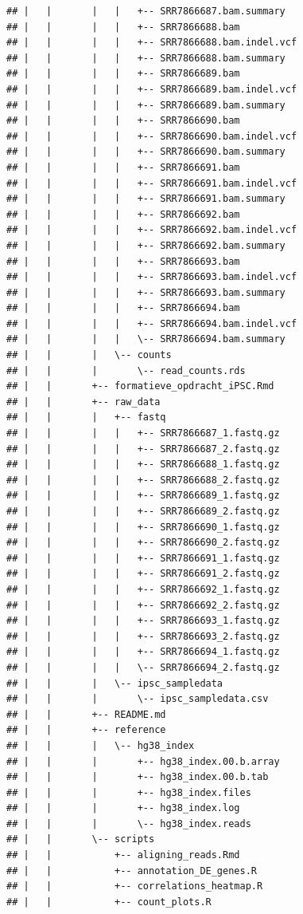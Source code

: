 \documentclass[
]{book}
\begin{document}
\begin{verbatim}
## |   |       |   |   +-- SRR7866687.bam.summary
## |   |       |   |   +-- SRR7866688.bam
## |   |       |   |   +-- SRR7866688.bam.indel.vcf
## |   |       |   |   +-- SRR7866688.bam.summary
## |   |       |   |   +-- SRR7866689.bam
## |   |       |   |   +-- SRR7866689.bam.indel.vcf
## |   |       |   |   +-- SRR7866689.bam.summary
## |   |       |   |   +-- SRR7866690.bam
## |   |       |   |   +-- SRR7866690.bam.indel.vcf
## |   |       |   |   +-- SRR7866690.bam.summary
## |   |       |   |   +-- SRR7866691.bam
## |   |       |   |   +-- SRR7866691.bam.indel.vcf
## |   |       |   |   +-- SRR7866691.bam.summary
## |   |       |   |   +-- SRR7866692.bam
## |   |       |   |   +-- SRR7866692.bam.indel.vcf
## |   |       |   |   +-- SRR7866692.bam.summary
## |   |       |   |   +-- SRR7866693.bam
## |   |       |   |   +-- SRR7866693.bam.indel.vcf
## |   |       |   |   +-- SRR7866693.bam.summary
## |   |       |   |   +-- SRR7866694.bam
## |   |       |   |   +-- SRR7866694.bam.indel.vcf
## |   |       |   |   \-- SRR7866694.bam.summary
## |   |       |   \-- counts
## |   |       |       \-- read_counts.rds
## |   |       +-- formatieve_opdracht_iPSC.Rmd
## |   |       +-- raw_data
## |   |       |   +-- fastq
## |   |       |   |   +-- SRR7866687_1.fastq.gz
## |   |       |   |   +-- SRR7866687_2.fastq.gz
## |   |       |   |   +-- SRR7866688_1.fastq.gz
## |   |       |   |   +-- SRR7866688_2.fastq.gz
## |   |       |   |   +-- SRR7866689_1.fastq.gz
## |   |       |   |   +-- SRR7866689_2.fastq.gz
## |   |       |   |   +-- SRR7866690_1.fastq.gz
## |   |       |   |   +-- SRR7866690_2.fastq.gz
## |   |       |   |   +-- SRR7866691_1.fastq.gz
## |   |       |   |   +-- SRR7866691_2.fastq.gz
## |   |       |   |   +-- SRR7866692_1.fastq.gz
## |   |       |   |   +-- SRR7866692_2.fastq.gz
## |   |       |   |   +-- SRR7866693_1.fastq.gz
## |   |       |   |   +-- SRR7866693_2.fastq.gz
## |   |       |   |   +-- SRR7866694_1.fastq.gz
## |   |       |   |   \-- SRR7866694_2.fastq.gz
## |   |       |   \-- ipsc_sampledata
## |   |       |       \-- ipsc_sampledata.csv
## |   |       +-- README.md
## |   |       +-- reference
## |   |       |   \-- hg38_index
## |   |       |       +-- hg38_index.00.b.array
## |   |       |       +-- hg38_index.00.b.tab
## |   |       |       +-- hg38_index.files
## |   |       |       +-- hg38_index.log
## |   |       |       \-- hg38_index.reads
## |   |       \-- scripts
## |   |           +-- aligning_reads.Rmd
## |   |           +-- annotation_DE_genes.R
## |   |           +-- correlations_heatmap.R
## |   |           +-- count_plots.R

\end{verbatim}
\end{document}
